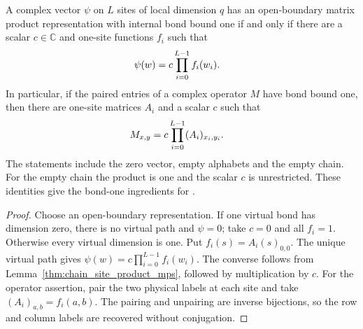 \begin{lemma}
    \label{thm:chain_bond_one_products}
    \leanok
    A complex vector $\psi$ on $L$ sites of local dimension $q$ has an
    open-boundary matrix product representation with internal bond
    bound one if and only if there are a scalar $c\in\mathbb C$ and
    one-site functions $f_i$ such that
    \begin{align}
        \psi(w) & =c\prod_{i=0}^{L-1}f_i(w_i). \notag
    \end{align}
    In particular, if the paired entries of a complex operator $M$
    have bond bound one, then there are one-site matrices $A_i$ and
    a scalar $c$ such that
    \begin{align}
        M_{x,y} & =c\prod_{i=0}^{L-1}(A_i)_{x_i,y_i}. \notag
    \end{align}
    The statements include the zero vector, empty alphabets and the
    empty chain. For the empty chain the product is one and the
    scalar $c$ is unrestricted.
    These identities give the bond-one ingredients for
    \cite[Proposition~5.7]{Arad2016RigorousRG}.
\end{lemma}
\begin{proof}\leanok
    Choose an open-boundary representation. If one virtual bond has
    dimension zero, there is no virtual path and $\psi=0$; take
    $c=0$ and all $f_i=1$. Otherwise every virtual dimension is one.
    Put $f_i(s)=A_i(s)_{0,0}$. The unique virtual path gives
    $\psi(w)=c\prod_{i=0}^{L-1}f_i(w_i)$. The converse follows from
    Lemma~\ref{thm:chain_site_product_mps}, followed by multiplication
    by $c$. For the operator assertion, pair the two physical labels
    at each site and take $(A_i)_{a,b}=f_i(a,b)$. The pairing and
    unpairing are inverse bijections, so the row and column labels
    are recovered without conjugation.
\end{proof}

